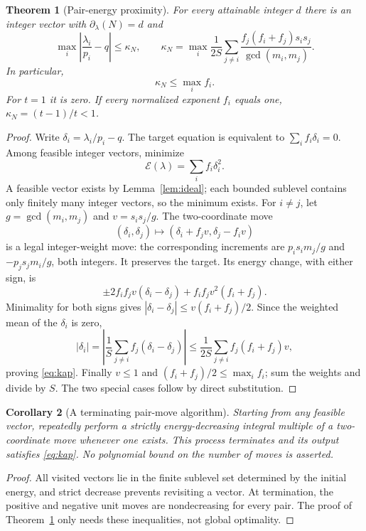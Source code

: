\documentclass[11pt]{article}
\newtheorem{theorem}{Theorem}[section]
\newtheorem{corollary}[theorem]{Corollary}
\theoremstyle{definition}\newtheorem{definition}[theorem]{Definition}
\theoremstyle{remark}\newtheorem{remark}[theorem]{Remark}
\begin{document}
\begin{theorem}[Pair-energy proximity]\label{thm:energy}
For every attainable integer $d$ there is an integer vector with
$\partial_\lambda(N)=d$ and
\begin{equation}\label{eq:kap}
\max_i\left|\frac{\lambda_i}{p_i}-q\right|\le\kappa_N,
\qquad
\kappa_N=\max_i\frac1{2S}\sum_{j\ne i}
\frac{f_j(f_i+f_j)s_i s_j}{\gcd(m_i,m_j)}.
\end{equation}
In particular,
\[
\kappa_N\le\max_i f_i.
\]
For $t=1$ it is zero. If every normalized exponent $f_i$ equals one,
$\kappa_N=(t-1)/t<1$.
\end{theorem}
\begin{proof}
Write $\delta_i=\lambda_i/p_i-q$. The target equation is equivalent to
$\sum_i f_i\delta_i=0$. Among feasible integer vectors, minimize
\[
\mathcal E(\lambda)=\sum_i f_i\delta_i^2.
\]
A feasible vector exists by Lemma~\ref{lem:ideal}; each bounded sublevel
contains only finitely many integer vectors, so the minimum exists.
For $i\ne j$, let $g=\gcd(m_i,m_j)$ and $v=s_i s_j/g$. The two-coordinate
move
\[
(\delta_i,\delta_j)\longmapsto
(\delta_i+f_jv,\delta_j-f_iv)
\]
is a legal integer-weight move: the corresponding increments are
$p_i s_i m_j/g$ and $-p_j s_j m_i/g$, both integers. It preserves the target.
Its energy change, with either sign, is
\[
\pm2f_i f_jv(\delta_i-\delta_j)+f_i f_jv^2(f_i+f_j).
\]
Minimality for both signs gives
$|\delta_i-\delta_j|\le v(f_i+f_j)/2$. Since the weighted mean of the
$\delta_i$ is zero,
\[
|\delta_i|=\left|\frac1S\sum_{j\ne i}f_j(\delta_i-\delta_j)\right|
\le\frac1{2S}\sum_{j\ne i}f_j(f_i+f_j)v,
\]
proving \eqref{eq:kap}. Finally $v\le1$ and
$(f_i+f_j)/2\le\max_i f_i$; sum the weights and divide by $S$.
The two special cases follow by direct substitution.
\end{proof}

\begin{corollary}[A terminating pair-move algorithm]\label{cor:algorithm}
Starting from any feasible vector, repeatedly perform a strictly
energy-decreasing integral multiple of a two-coordinate move whenever
one exists. This process terminates and its output satisfies
\eqref{eq:kap}. No polynomial bound on the number of moves is asserted.
\end{corollary}
\begin{proof}
All visited vectors lie in the finite sublevel set determined by the
initial energy, and strict decrease prevents revisiting a vector.
At termination, the positive and negative unit moves are nondecreasing
for every pair. The proof of Theorem~\ref{thm:energy} only needs these
inequalities, not global optimality.
\end{proof}
\end{document}
